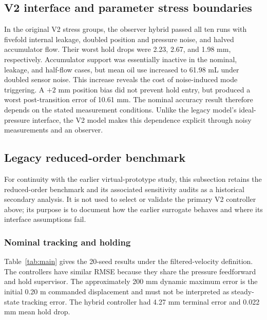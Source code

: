 \documentclass[machines,article,submit,pdftex,moreauthors]{Definitions/mdpi}
\begin{document}
\subsection{V2 interface and parameter stress boundaries}
In the original V2 stress groups, the observer hybrid passed all ten runs with fivefold internal leakage, doubled position and pressure noise, and halved accumulator flow. Their worst hold drops were 2.23, 2.67, and 1.98 mm, respectively. Accumulator support was essentially inactive in the nominal, leakage, and half-flow cases, but mean oil use increased to 61.98 mL under doubled sensor noise. This increase reveals the cost of noise-induced mode triggering. A $+2$ mm position bias did not prevent hold entry, but produced a worst post-transition error of 10.61 mm. The nominal accuracy result therefore depends on the stated measurement conditions. Unlike the legacy model's ideal-pressure interface, the V2 model makes this dependence explicit through noisy measurements and an observer.

\subsection{Legacy reduced-order benchmark}
For continuity with the earlier virtual-prototype study, this subsection retains the reduced-order benchmark and its associated sensitivity audits as a historical secondary analysis. It is not used to select or validate the primary V2 controller above; its purpose is to document how the earlier surrogate behaves and where its interface assumptions fail.

\subsubsection{Nominal tracking and holding}
Table~\ref{tab:main} gives the 20-seed results under the filtered-velocity definition. The controllers have similar RMSE because they share the pressure feedforward and hold supervisor. The approximately 200 mm dynamic maximum error is the initial 0.20 m commanded displacement and must not be interpreted as steady-state tracking error. The hybrid controller had 4.27 mm terminal error and 0.022 mm mean hold drop.
\end{document}
